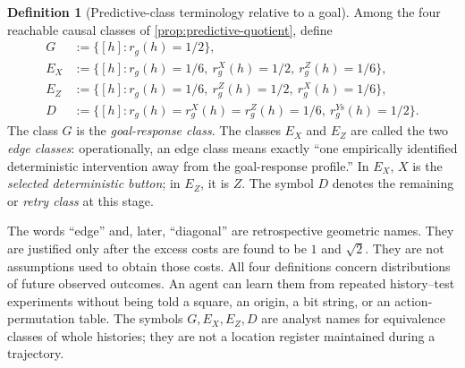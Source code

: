 \documentclass[11pt]{article}
\theoremstyle{definition}
\newtheorem{definition}[theorem]{Definition}
\theoremstyle{remark}
\begin{document}
\begin{definition}[Predictive-class terminology relative to a goal]
\label{def:edge-class}
Among the four reachable causal classes of
\cref{prop:predictive-quotient}, define
\begin{align*}
 G&:=\{[h]:r_g(h)=1/2\},\\
 E_X&:=\{[h]:r_g(h)=1/6,\ r_g^X(h)=1/2,\ r_g^Z(h)=1/6\},\\
 E_Z&:=\{[h]:r_g(h)=1/6,\ r_g^Z(h)=1/2,\ r_g^X(h)=1/6\},\\
 D&:=\{[h]:r_g(h)=r_g^X(h)=r_g^Z(h)=1/6,
                 \ r_g^{Y\mathrm s}(h)=1/2\}.
\end{align*}
The class \(G\) is the \emph{goal-response class}.  The classes \(E_X\) and
\(E_Z\) are called the two \emph{edge classes}: operationally, an edge class
means exactly ``one empirically identified deterministic intervention away
from the goal-response profile.''  In \(E_X\), \(X\) is the \emph{selected
deterministic button}; in \(E_Z\), it is \(Z\).  The symbol \(D\) denotes the
remaining or \emph{retry class} at this stage.
\end{definition}

The words ``edge'' and, later, ``diagonal'' are retrospective geometric names.
They are justified only after the excess costs are found to be \(1\) and
\(\sqrt2\).  They are not assumptions used to obtain those costs.  All four
definitions concern distributions of future observed outcomes.  An agent can
learn them from repeated history--test experiments without being told a square,
an origin, a bit string, or an action-permutation table.  The symbols
\(G,E_X,E_Z,D\) are analyst names for equivalence classes of whole histories;
they are not a location register maintained during a trajectory.
\end{document}
